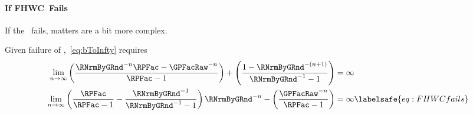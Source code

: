 \documentclass[\econtexRoot/BufferStockTheory]{subfiles}
\begin{document}

\paragraph{If {FHWC}~Fails}
If the \FHWC~fails, matters are a bit more complex.

Given failure of \FHWC,~\eqref{eq:bToInfty} requires
\begin{equation}\begin{gathered}\begin{aligned}
  \lim_{n \rightarrow \infty} \left(\frac{\RNrmByGRnd^{-n}\RPFac-\GPFacRaw^{-n}}{\RPFac-1}\right) + \left(\frac{1-\RNrmByGRnd^{-(n+1)}}{\RNrmByGRnd^{-1}-1}\right)  & = \infty \notag
  \\   \lim_{n \rightarrow \infty} \left(\frac{\RPFac}{\RPFac-1}-\frac{\RNrmByGRnd^{-1}}{\RNrmByGRnd^{-1}-1}\right)\RNrmByGRnd^{-n}-\left(\frac{\GPFacRaw^{-n}}{\RPFac-1}\right)  & = \infty \labelsafe{eq:FHWCfails} 
\end{aligned}\end{gathered}\end{equation}
\hypertarget{PFGICHoldsFHWCFailsRICFailsDiscuss}{}
\end{document}
